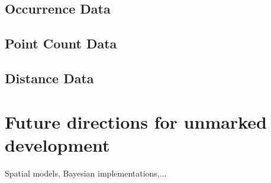 \subsection{Occurrence Data}


\subsection{Point Count Data}


\subsection{Distance Data}

\section{Future directions for unmarked development}

Spatial models, Bayesian implementations,...











